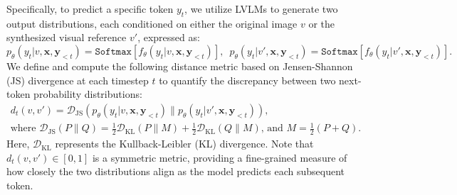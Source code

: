 %
Specifically, to predict a specific token $y_t$, we utilize LVLMs to generate two output distributions, each conditioned on either the original image $v$ or the synthesized visual reference $v'$, expressed as:
\begin{equation}
    p_{\theta}(y_t | v, \mathbf{x}, \mathbf{y}_{<t})\!=\!\mathtt{Softmax}\!\left[f_\theta(y_{t}| v,\mathbf{x},\mathbf{y}_{<t})\right]\!, \,\,\, p_{\theta}(y_t | v', \mathbf{x}, \mathbf{y}_{<t})\!=\!\mathtt{Softmax}\!\left[f_\theta(y_{t}| v',\mathbf{x},\mathbf{y}_{<t})\right].
\end{equation}
We define and compute the following distance metric based on Jensen-Shannon (JS) divergence at each timestep $t$ to quantify the discrepancy between two next-token probability distributions:
\begin{gather} 
    d_t(v, v') = \mathcal{D}_{\mathrm{JS}} \left(p_{\theta}\left(y_t | v, \mathbf{x},\mathbf{y}_{<t}\right) \parallel p_{\theta}\left(y_t | v', \mathbf{x},\mathbf{y}_{<t}\right) \right), \nonumber\\
\text{where} \,\, \mathcal{D}_{\mathrm{JS}}(P \parallel Q) = \frac{1}{2} \mathcal{D}_{\mathrm{KL}}(P \parallel M) + \frac{1}{2} \mathcal{D}_{\mathrm{KL}}(Q \parallel M), \,\text{and} \,\, M=\frac{1}{2}(P+Q).
\end{gather}
Here, $\mathcal{D}_{\mathrm{KL}}$ represents the Kullback-Leibler (KL) divergence. Note that $d_t(v, v') \in [0, 1]$ is a symmetric metric, providing a fine-grained measure of how closely the two distributions align as the model predicts each subsequent token. 

